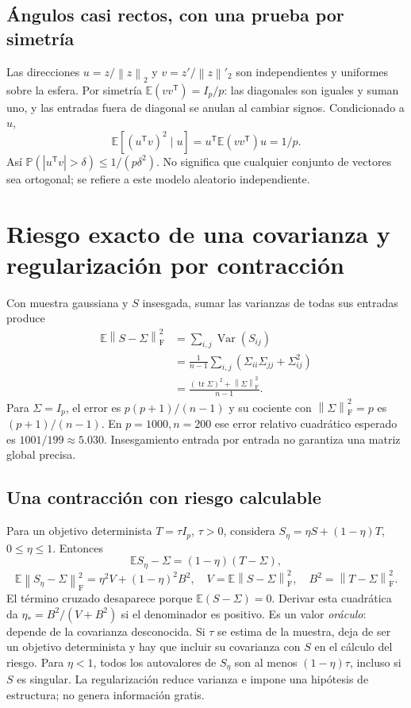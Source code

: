 \documentclass[11pt,a4paper]{article}
\newcommand{\E}{\mathbb E}
\newcommand{\Prob}{\mathbb P}
\newcommand{\T}{^{\mathsf T}}
\newcommand{\norm}[1]{\left\lVert #1\right\rVert}
\DeclareMathOperator{\Var}{Var}
\DeclareMathOperator{\tr}{tr}
\newcommand{\F}{_{\mathrm F}}
\theoremstyle{definition}
\begin{document}
\subsection{Ángulos casi rectos, con una prueba por simetría}
Las direcciones $u=z/\norm z_2$ y $v=z'/\norm z'_2$ son independientes y uniformes sobre la esfera. Por simetría $\E(vv\T)=I_p/p$: las diagonales son iguales y suman uno, y las entradas fuera de diagonal se anulan al cambiar signos. Condicionado a $u$,
\[
\E[(u\T v)^2\mid u]=u\T\E(vv\T)u=1/p.
\]
Así $\Prob(|u\T v|>\delta)\le1/(p\delta^2)$. No significa que cualquier conjunto de vectores sea ortogonal; se refiere a este modelo aleatorio independiente.

\section{Riesgo exacto de una covarianza y regularización por contracción}
Con muestra gaussiana y $S$ insesgada, sumar las varianzas de todas sus entradas produce
\begin{align*}
\E\norm{S-\Sigma}\F^2
&=\sum_{i,j}\Var(S_{ij})\\
&=\frac1{n-1}\sum_{i,j}(\Sigma_{ii}\Sigma_{jj}+\Sigma_{ij}^2)\\
&=\boxed{\frac{(\tr\Sigma)^2+\norm\Sigma\F^2}{n-1}}.
\end{align*}
Para $\Sigma=I_p$, el error es $p(p+1)/(n-1)$ y su cociente con $\norm\Sigma\F^2=p$ es $(p+1)/(n-1)$. En $p=1000,n=200$ ese error relativo cuadrático esperado es $1001/199\approx5.030$. Insesgamiento entrada por entrada no garantiza una matriz global precisa.
\subsection{Una contracción con riesgo calculable}
Para un objetivo determinista $T=\tau I_p$, $\tau>0$, considera $S_\eta=\eta S+(1-\eta)T$, $0\le\eta\le1$. Entonces
\[
\E S_\eta-\Sigma=(1-\eta)(T-\Sigma),
\]
\[
\E\norm{S_\eta-\Sigma}\F^2=\eta^2 V+(1-\eta)^2B^2,
\quad V=\E\norm{S-\Sigma}\F^2,\quad B^2=\norm{T-\Sigma}\F^2.
\]
El término cruzado desaparece porque $\E(S-\Sigma)=0$. Derivar esta cuadrática da $\eta_*=B^2/(V+B^2)$ si el denominador es positivo. Es un valor \emph{oráculo}: depende de la covarianza desconocida. Si $\tau$ se estima de la muestra, deja de ser un objetivo determinista y hay que incluir su covarianza con $S$ en el cálculo del riesgo.
Para $\eta<1$, todos los autovalores de $S_\eta$ son al menos $(1-\eta)\tau$, incluso si $S$ es singular. La regularización reduce varianza e impone una hipótesis de estructura; no genera información gratis.
\end{document}

